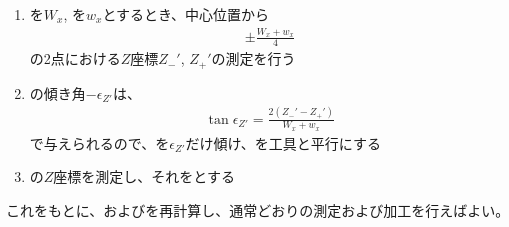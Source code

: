 \begin{enumerate}[label=\sarrow]
\item \ACOD を$W_x$, \TopEndACID を$w_x$とするとき、中心位置から
\begin{align*}
  \pm\frac{W_x+w_x}4
\end{align*}
の2点における$Z$座標$Z_-'$, $Z_+'$の測定を行う
\item \TopEndFace の傾き角$-\epsilon_{Z'}$は、
\begin{align*}
  \tan\epsilon_{Z'} = \frac{2(Z_-'-Z_+')}{W_x+w_x}
\end{align*}
で与えられるので、\Table を$\epsilon_{Z'}$だけ傾け、\TopEndFace を工具と平行にする
\item \TopEndFace の$Z$座標を測定し、それを\TopAlocationLength とする
\end{enumerate}
これをもとに、\AlocationAngle および\DimpleAngle を再計算し、通常どおり\Dimple の測定および加工を行えばよい。



